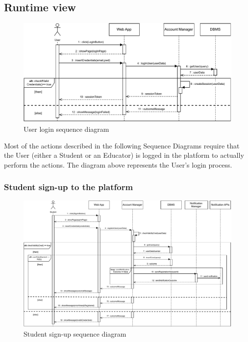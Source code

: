\documentclass{article}
\begin{document}
{\subsection{Runtime view}
    \begin{figure}[H]
        \centering
        \hspace*{-1cm}\includegraphics[scale=0.8]{Sequence/SequenceLogin.pdf}
        \caption{User login sequence diagram}
        \label{fig:userLogin}
    \end{figure}

    Most of the actions described in the following Sequence Diagrams require that the User
    (either a Student or an Educator) is logged in the platform to actually perform the actions.
    The diagram above represents the User's login process.

    \subsubsection{Student sign-up to the platform}
        \begin{figure}[H]
            \centering
            \hspace*{-2cm}\includegraphics[scale=0.65]{Sequence/Sequence1DD.pdf}
            \caption{Student sign-up sequence diagram}
            \label{fig:Sequence1DD}
        \end{figure}

}
\end{document}
